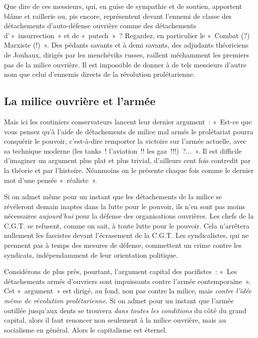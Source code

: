 \documentclass[french,twoside]{book} %
\begin{document}
Que dire de ces messieurs, qui, en guise de sympathie et de soutien, apportent blâme et raillerie ou, pis encore, représentent devant l’ennemi de classe des détachements d’auto-défense ouvrière comme des détachements d’ « insurrection » et de « putsch » ? Regardez, en particulier le « Combat (?) Marxiste (!) ». Des pédants savants et à demi savants, des adjudants théoriciens de Jouhaux, dirigés par les menchéviks russes, raillent méchamment les premiers pas de la milice ouvrière. Il est impossible de donner à de tels messieurs d’autre nom que celui d’ennemis directs de la révolution prolétarienne.
\subsection[{La milice ouvrière et l’armée}]{La milice ouvrière et l’armée}
\noindent Mais ici les routiniers conservateurs lancent leur dernier argument : « Est-ce que vous pensez qu’à l’aide de détachements de milice mal armés le prolétariat pourra conquérir le pouvoir, c’est-à-dire remporter la victoire sur l’armée actuelle, avec sa technique moderne (les tanks ! l’aviation !! les gaz !!!) ?... ». Il est difficile d’imaginer un argument plus plat et plus trivial, d’ailleurs cent fois  contredit par la théorie et par l’histoire. Néanmoins on le présente chaque fois comme le dernier mot d’une pensée « réaliste ».\par
Si on admet même pour un instant que les détachements de la milice se révéleront demain inaptes dans la lutte pour le pouvoir, ils n’en sont pas moins nécessaires \emph{aujourd’hui} pour la défense des organisations ouvrières. Les chefs de la C.G.T. se refusent, comme on sait, à toute lutte pour le pouvoir. Cela n’arrêtera nullement les fascistes devant l’écrasement de la C.G.T. Les syndicalistes, qui ne prennent pas à temps des mesures de défense, commettent un crime contre les syndicats, indépendamment de leur orientation politique.\par
Considérons de plus près, pourtant, l’argument capital des pacifistes : « Les détachements armés d’ouvriers sont impuissants contre l’armée contemporaine ». Cet « argument » est dirigé, au fond, non pas contre la milice, mais \emph{contre l’idée même de révolution prolétarienne}. Si on admet pour un instant que l’armée outillée jusqu’aux dents se trouvera \emph{dans toutes les conditions} du côté du grand capital, alors il faut renoncer non seulement à la milice ouvrière, mais au socialisme en général. Alors le capitalisme est éternel.\par
\end{document}
